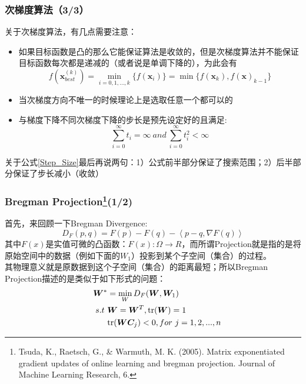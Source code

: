 \documentclass{beamer}
\begin{document}
\begin{frame}\frametitle{次梯度算法（3/3）}
关于次梯度算法，有几点需要注意：
\begin{itemize}
\item 如果目标函数是凸的那么它能保证算法是收敛的，但是次梯度算法并不能保证目标函数每次都是递减的（或者说是单调下降的），为此会有
\begin{displaymath}
f(\bm{x}_{best}^{(k)})=\min_{i=0,1,...,k}\{f(\bm{x}_i)\}=\min\{f(\bm{x}_k),f(\bm{x})_{k-1}\}
\end{displaymath}
\item 当次梯度方向不唯一的时候理论上是选取任意一个都可以的
\item 与梯度下降不同次梯度下降的步长是预先设定好的且满足:
\begin{equation}
\label{Step_Size}
\sum_{i=0}^{\infty}t_i = \infty~and~\sum_{i=0}^{\infty} t_{i}^{2} < \infty
\end{equation}
\end{itemize}
关于公式\ref{Step_Size}最后再说两句：1）公式前半部分保证了搜索范围；2）后半部分保证了步长减小（收敛）
\end{frame}
\begin{frame}\frametitle{Bregman Projection\footnote{Tsuda, K., Raetsch, G., \& Warmuth, M. K. (2005). Matrix exponentiated gradient updates of online learning and bregman projection. Journal of Machine Learning Research, 6.}(1/2)}
\label{Bregman_Projection}
首先，来回顾一下Bregman Divergence:
\begin{displaymath}
D_{F}(p,q)=F(p)-F(q)-\left<p-q,\nabla F(q)\right>
\end{displaymath}
其中$F(x)$是实值可微的凸函数：$F(x):\Omega \rightarrow R$，而所谓Projection就是指的是将原始空间中的数据（例如下面的$W_1$）投影到某个子空间（集合）的过程。\\
其物理意义就是原数据到这个子空间（集合）的距离最短；所以Bregman  Projection描述的是类似于如下形式的问题：
\begin{displaymath}
\begin{split}
\bm{W}^{*}&=\min_{W} D_F(\bm{W},\bm{W}_1)\\
~~~~s.t~&\bm{W}=\bm{W}^{T},{\rm tr}(\bm{W})=1\\
&{\rm tr}(\bm{W}\bm{C}_j)<0,for~j=1,2,...,n\\
\end{split}
\end{displaymath}
\end{frame}
\end{document}
